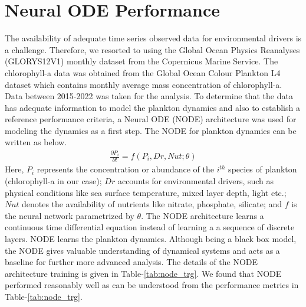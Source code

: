 \documentclass{article}
\begin{document}
\section{Neural ODE Performance}
The availability of adequate time series observed data for environmental drivers is a challenge. Therefore, we resorted to using the Global Ocean Physics Reanalyses (GLORYS12V1) monthly dataset from the Copernicus Marine Service. The chlorophyll-a data was obtained from the Global Ocean Colour Plankton L4 dataset which contains monthly average mass concentration of chlorophyll-a. Data between 2015-2022 was taken for the analysis. To determine that the data has adequate information to model the plankton dynamics and also to establish a reference performance criteria, a Neural ODE (NODE) architecture was used for modeling the dynamics as a first step. The NODE for plankton dynamics can be written as below.
    \begin{align*}
    \frac{\partial P_i}{\partial t} = f(P_i, Dr, Nut;\theta)
    \label{eq:plankton_node}
    \end{align*}
Here, $P_i$ represents the concentration or abundance of the $i^{th}$ species of plankton (chlorophyll-a in our case); $Dr$ accounts for environmental drivers, such as physical conditions like sea surface temperature, mixed layer depth, light etc.; $Nut$ denotes the availability of nutrients like nitrate, phosphate, silicate; and $f$ is the neural network parametrized by $\theta$. The NODE architecture learns a continuous time differential equation instead of learning a a sequence of discrete layers. NODE learns the plankton dynamics. Although being a black box model, the NODE gives valuable understanding of dynamical systems and acts as a baseline for further more advanced analysis. The details of the NODE architecture training is given in Table-\ref{tab:node_trg}. We found that NODE performed reasonably well as can be understood from the performance metrics in Table-\ref{tab:node_trg}. 
\end{document}
